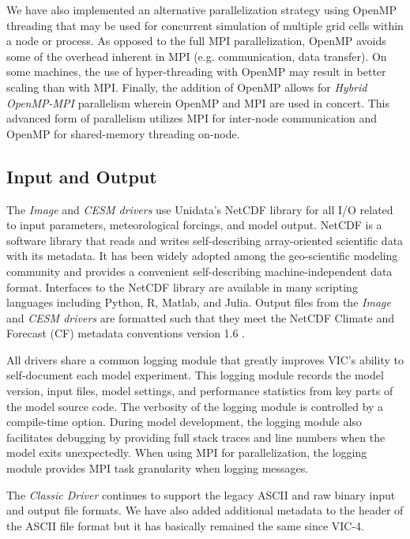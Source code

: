 \documentclass[gmd, manuscript]{copernicus}
\begin{document}
    We have also implemented an alternative parallelization strategy using OpenMP threading that may be used for concurrent simulation of multiple grid cells within a node or process. As opposed to the full MPI parallelization, OpenMP avoids some of the overhead inherent in MPI (e.g. communication, data transfer). On some machines, the use of hyper-threading with OpenMP may result in better scaling than with MPI. Finally, the addition of OpenMP allows for \textit{Hybrid OpenMP-MPI} parallelism wherein OpenMP and MPI are used in concert. This advanced form of parallelism utilizes MPI for inter-node communication and OpenMP for shared-memory threading on-node.

  \subsection{Input and Output}
    \label{sec:io}
    The \textit{Image} and \textit{CESM drivers} use Unidata's NetCDF library for all I/O related to input parameters, meteorological forcings, and model output. NetCDF is a software library that reads and writes self-describing array-oriented scientific data with its metadata. It has been widely adopted among the geo-scientific modeling community and provides a convenient self-describing machine-independent data format. Interfaces to the NetCDF library are available in many scripting languages including Python, R, Matlab, and Julia. Output files from the \textit{Image} and \textit{CESM drivers} are formatted such that they meet the NetCDF Climate and Forecast (CF) metadata conventions version 1.6 \citep{Eaton_2003}.

    All drivers share a common logging module that greatly improves VIC's ability to self-document each model experiment. This logging module records the model version, input files, model settings, and performance statistics from key parts of the model source code. The verbosity of the logging module is controlled by a compile-time option. During model development, the logging module also facilitates debugging by providing full stack traces and line numbers when the model exits unexpectedly. When using MPI for parallelization, the logging module provides MPI task granularity when logging messages.

    The \textit{Classic Driver} continues to support the legacy ASCII and raw binary input and output file formats. We have also added additional metadata to the header of the ASCII file format but it has basically remained the same since VIC-4.
\end{document}
